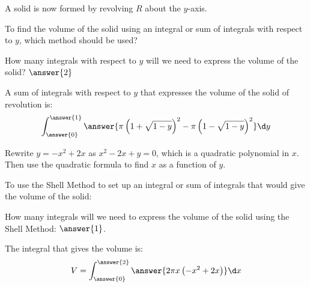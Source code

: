 \documentclass{ximera}
\begin{document}
A solid is now formed by revolving $R$ about the $y$-axis.

To find the volume of the solid using an integral or sum of integrals with respect to $y$, which method should be used?

  \begin{multipleChoice}
  \end{multipleChoice}

How many integrals with respect to $y$ will we need to express the volume of the solid? $\answer{2}$


\begin{exercise}

A sum of integrals with respect to $y$ that expresses the volume of the solid of revolution is: 
\[
\int_{\answer{0}}^{\answer{1}} \answer{\pi \left( 1+\sqrt{1-y} \right)^{2} - \pi \left(1 -\sqrt{1-y} \right)^{2}} \d y
\]
\begin{hint}
Rewrite $y=-x^{2}+2x$ as $x^{2}-2x+y=0$, which is a quadratic polynomial in $x$. Then use the quadratic formula to find $x$ as a function of $y$. 
\end{hint}

\end{exercise}

To use the Shell Method to set up an integral or sum of integrals that would give the volume of the solid: 

  \begin{multipleChoice}
  \end{multipleChoice}

How many integrals will we need to express the volume of the solid using the Shell Method: $\answer{1}$. 


\begin{exercise} 
The integral that gives the volume is: 
\[
V=\int_{\answer{0}}^{\answer{2}} \answer{ 2\pi x \left(-x^{2}+2x \right)} \d x
\] 


\end{exercise}
\end{document}
